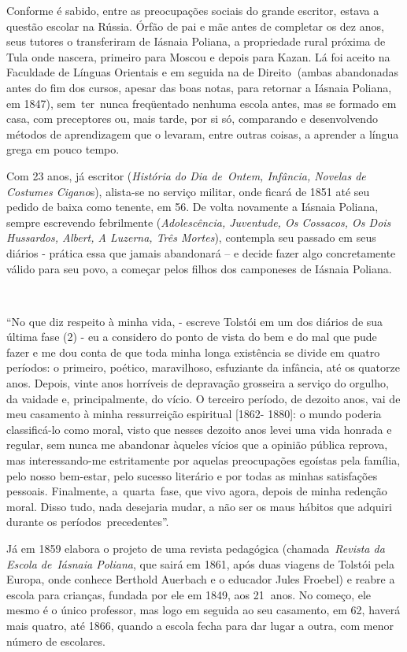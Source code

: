 Conforme é sabido, entre as preocupações sociais do grande escritor,
estava a questão escolar na Rússia. Órfão de pai e mãe antes de
completar os dez anos, seus tutores o transferiram de Iásnaia Poliana, a
propriedade rural próxima de Tula onde nascera, primeiro para Moscou e
depois para Kazan. Lá foi aceito na Faculdade de Línguas Orientais e em
seguida na de Direito\textbf{~}(ambas abandonadas antes do fim dos
cursos, apesar das boas notas, para retornar a Iásnaia Poliana, em
1847), sem~ter~nunca freqüentado nenhuma escola antes, mas se formado em
casa, com preceptores ou, mais tarde, por si só, comparando e
desenvolvendo métodos de aprendizagem que o levaram, entre outras
coisas, a aprender a língua grega em pouco tempo.

Com 23 anos, já escritor (\emph{História do Dia de~Ontem, Infância,
Novelas de Costumes Cigano}s), alista-se no serviço militar, onde ficará
de 1851 até seu pedido de baixa como tenente, em 56. De volta novamente
a Iásnaia Poliana, sempre escrevendo febrilmente (\emph{Adolescência,
Juventude, Os Cossacos, Os Dois Hussardos, Albert, A Luzerna, Três
Mortes}), contempla seu passado em seus diários - prática essa que
jamais abandonará -- e decide fazer algo concretamente válido para seu
povo, a começar pelos filhos dos camponeses de Iásnaia Poliana.~

~

``No que diz respeito à minha vida, - escreve Tolstói em um dos diários
de sua última fase (2) - eu a considero do ponto de vista do bem e do
mal que pude fazer e me dou conta de que toda minha longa existência se
divide em quatro períodos: o primeiro, poético, maravilhoso, esfuziante
da infância, até os quatorze anos. Depois, vinte anos horríveis de
depravação grosseira a serviço do orgulho, da vaidade e, principalmente,
do vício. O terceiro período, de dezoito anos, vai de meu casamento à
minha ressurreição espiritual {[}1862- 1880{]}: o mundo poderia
classificá-lo como moral, visto que nesses dezoito anos levei uma vida
honrada e regular, sem nunca me abandonar àqueles vícios que a opinião
pública reprova, mas interessando-me estritamente por aquelas
preocupações egoístas pela família, pelo nosso bem-estar, pelo sucesso
literário e por todas as minhas satisfações pessoais. Finalmente,
a~quarta~fase, que vivo agora, depois de minha redenção moral. Disso
tudo, nada desejaria mudar, a não ser os maus hábitos que adquiri
durante os períodos~precedentes''.

Já em 1859 elabora o projeto de uma revista pedagógica
(chamada~\emph{Revista da Escola de}~\emph{Iásnaia Poliana}, que sairá
em 1861, após duas viagens de Tolstói pela Europa, onde conhece Berthold
Auerbach e o educador Jules Froebel) e reabre a escola para crianças,
fundada por ele em 1849, aos 21\textbf{~}anos. No começo, ele mesmo é o
único professor, mas logo em seguida ao seu casamento, em 62, haverá
mais quatro, até 1866, quando a escola fecha para dar lugar a outra, com
menor número de escolares.


